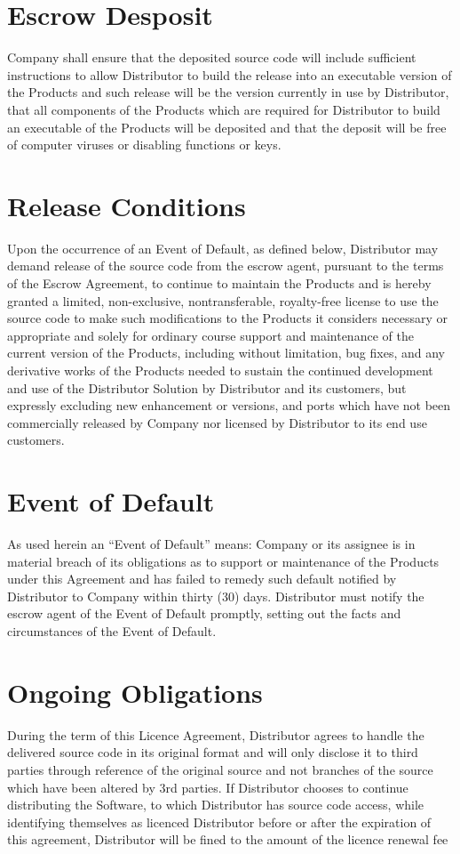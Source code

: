 \documentclass[letterpaper,10pt,english]{sphinxmanual}
\begin{document}
\section{Escrow Desposit}
\label{\detokenize{escrow:escrow-desposit}}
Company shall ensure that the deposited source code will include sufficient instructions to allow Distributor to build the release into an executable version of the Products and such release will be the version currently in use by Distributor, that all components of the Products which are required for Distributor to build an executable of the Products will be deposited and that the deposit will be free of computer viruses or disabling functions or keys.


\section{Release Conditions}
\label{\detokenize{escrow:release-conditions}}
Upon the occurrence of an Event of Default, as defined below, Distributor may demand release of the source code from the escrow agent, pursuant to the terms of the Escrow Agreement, to continue to maintain the Products and is hereby granted a limited, non-exclusive, nontransferable, royalty-free license to use the source code to make such modifications to the Products it considers necessary or appropriate and solely for ordinary course support and maintenance of the current version of the Products, including without limitation, bug fixes, and any derivative works of the Products needed to sustain the continued development and use of the Distributor Solution by Distributor and its customers, but expressly excluding new enhancement or versions,  and ports which have not been commercially released by Company nor licensed by Distributor to its end use customers.


\section{Event of Default}
\label{\detokenize{escrow:event-of-default}}
As used herein an “Event of Default” means: Company or its assignee is in material breach of its obligations as to support or maintenance of the Products under this Agreement and has failed to remedy such default notified by Distributor to Company within thirty (30) days.  Distributor must notify the escrow agent of the Event of Default promptly, setting out the facts and circumstances of the Event of Default.


\section{Ongoing Obligations}
\label{\detokenize{escrow:ongoing-obligations}}
During the term of this Licence Agreement, Distributor agrees to handle the delivered source code in its original format and will only disclose it to third parties through reference of the original source and not branches of the source which have been altered by 3rd parties. If Distributor chooses to continue distributing the Software, to which Distributor has source code access, while identifying themselves as licenced Distributor before or after the expiration of this agreement, Distributor will be fined to the amount of the licence renewal fee
\end{document}

